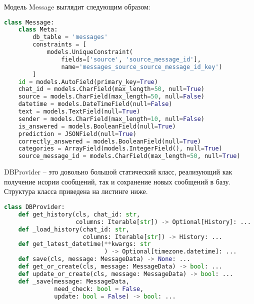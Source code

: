     \newpage
    Модель Message выглядит следующим образом:
\begin{lstlisting}[language=Python]
class Message:
    class Meta:
        db_table = 'messages'
        constraints = [
            models.UniqueConstraint(
                fields=['source', 'source_message_id'],
                name='messages_source_source_message_id_key')
        ]
    id = models.AutoField(primary_key=True)
    chat_id = models.CharField(max_length=50, null=True)
    source = models.CharField(max_length=50, null=False)
    datetime = models.DateTimeField(null=False)
    text = models.TextField(null=True)
    sender = models.CharField(max_length=10, null=False)
    is_answered = models.BooleanField(null=True)
    prediction = JSONField(null=True)
    correctly_answered = models.BooleanField(null=True)
    categories = ArrayField(models.IntegerField(), null=True)
    source_message_id = models.CharField(max_length=50, null=True)
\end{lstlisting}

    DBProvider -- это довольно большой статический класс, реализующий как получение исории сообщений,
    так и сохранение новых сообщений в базу.
    Структура класса приведена на листинге ниже.
\begin{lstlisting}[language=Python]
class DBProvider:
    def get_history(cls, chat_id: str, 
                    columns: Iterable[str]) -> Optional[History]: ...
    def _load_history(chat_id: str, 
                      columns: Iterable[str]) -> History: ...
    def get_latest_datetime(**kwargs: str
                            ) -> Optional[timezone.datetime]: ...
    def save(cls, message: MessageData) -> None: ...
    def get_or_create(cls, message: MessageData) -> bool: ...
    def update_or_create(cls, message: MessageData) -> bool: ...
    def _save(message: MessageData, 
              need_check: bool = False, 
              update: bool = False) -> bool: ...
\end{lstlisting}

